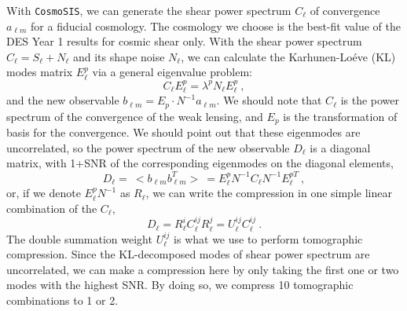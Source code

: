 \documentclass[twocolumn]{\docclass}
\newcommand\be{\begin{equation}}
\newcommand\ee{\end{equation}}
\begin{document}
	With  {\tt CosmoSIS}, we can generate the shear power spectrum $C_{\ell}$ of convergence $a_{\ell m}$ for a fiducial cosmology. The cosmology we choose is the best-fit value of the DES Year 1 results for cosmic shear only. With the shear power spectrum $C_{\ell}=S_{\ell}+N_{\ell}$ and its shape noise $N_{\ell}$, we can calculate the Karhunen-Lo\'eve (KL) modes matrix $E^p_{\ell}$ via a general eigenvalue problem:
	\be
	C_{\ell} E^p_{\ell} = \lambda ^p N_{\ell} E^p_{\ell}\
	,\ee
	and the new observable $b_{\ell m} = E_p \cdot N^{-1} a_{\ell m}$. We should note that $C_{\ell}$ is the power spectrum of the convergence of the weak lensing, and $E_p$ is the transformation of basis for the convergence. We should point out that these eigenmodes are uncorrelated, so the power spectrum of the new observable $D_{\ell}$ is a diagonal matrix, with 1+SNR of the corresponding eigenmodes on the diagonal elements,
	\be
	D_{\ell} =\ <b_{\ell m} b_{\ell m}^T>\ = E^p_{\ell} N^{-1} C_{\ell} N^{-1} E^{pT}_{\ell}\
	,\ee
	or, if we denote $E^p_{\ell} N^{-1}$ as $R_{\ell}$, we can write the compression in one simple linear combination of the $C_{\ell}$,
	\be
	D_{\ell} = R_{\ell}^i C_{\ell}^{ij} R_{\ell}^j = U_{\ell}^{ij} C_{\ell}^{ij}\
	.\ee
	The double summation weight $U_{\ell}^{ij}$ is what we use to perform tomographic compression. Since the KL-decomposed modes of shear power spectrum are uncorrelated, we can make a compression here by only taking the first one or two modes with the highest SNR. By doing so, we compress 10 tomographic combinations to 1 or 2.
	
\end{document}
